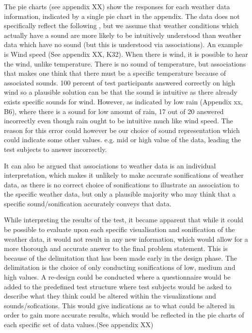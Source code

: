 The pie charts (see appendix XX) show the responses for each weather data information, indicated by a single pie chart in the appendix. The data does not specifically reflect the following , but we assume that weather conditions which actually have a sound are more likely to be intuitively understood than weather data which have no sound (but this is understood via associations). An example is Wind speed (See appendix XX, K32). When there is wind, it is possible to hear the wind, unlike temperature. There is no sound of temperature, but associations that makes one think that there must be a specific temperature because of associated sounds. 100 percent of test participants answered correctly on high wind so a plausible solution can be that the sound is intuitive as there already exists specific sounds for wind. However, as indicated by low rain (Appendix xx,  B6), where there is a sound for low amount of rain, 17 out of 20 answered incorrectly even though rain ought to be intuitive much like wind speed. The reason for this error could however be our choice of sound representation which could indicate some other values. e.g. mid or high value of the data, leading the test subjects to answer incorrectly.

It can also be argued that associations to weather data is an individual interpretation, which makes it unlikely to make accurate sonifications of weather data, as there is no correct choice of sonifications to illustrate an association to the specific weather data, but only a plausible majority who may think that a specific sound/sonification accurately conveys that data.

While interpreting the results of the test, it became apparent that while it could be possible to evaluate upon each specific visualisation and sonification of the weather data, it would not result in any new information, which would allow for a more thorough and accurate answer to the final problem statement. This is because of the delimitation that has been made early in the design phase. The delimitation is the choice of only conducting sonifications of low, medium and high values. A re-design could be conducted where a questionnaire would be added to the predefined test structure where test subjects would be asked to describe what they think could be altered within the visualizations and sounds/sofications. This would give indications as to what could be altered in order to gain more accurate results, which would be reflected in the pie charts of each specific set of data values.(See appendix XX)

